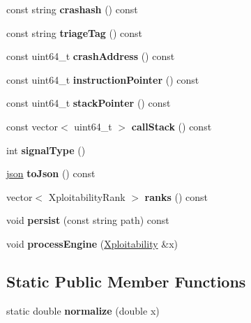 \begin{DoxyCompactItemize}
const string {\bfseries crashash} () const
\item 
\mbox{\label{classsl2_1_1_triage_ad5782327c97ac20a062688c6fb43eadc}} 
const string {\bfseries triage\+Tag} () const
\item 
\mbox{\label{classsl2_1_1_triage_a7160ecfc3f0b06cf74f68e9e6d1f74f7}} 
const uint64\+\_\+t {\bfseries crash\+Address} () const
\item 
\mbox{\label{classsl2_1_1_triage_aa206d88c999337680a8fb26abd024e5d}} 
const uint64\+\_\+t {\bfseries instruction\+Pointer} () const
\item 
\mbox{\label{classsl2_1_1_triage_acd973b42f743335196e8df108580ae54}} 
const uint64\+\_\+t {\bfseries stack\+Pointer} () const
\item 
\mbox{\label{classsl2_1_1_triage_a762ce49ae353fcdc96731eddbcd08cb5}} 
const vector$<$ uint64\+\_\+t $>$ {\bfseries call\+Stack} () const
\item 
\mbox{\label{classsl2_1_1_triage_a41dd1c06e89d051cbdb70ea6f7599e84}} 
int {\bfseries signal\+Type} ()
\item 
\mbox{\label{classsl2_1_1_triage_a40c223374522702fb6ce3a4951477c39}} 
\mbox{\hyperlink{classnlohmann_1_1basic__json}{json}} {\bfseries to\+Json} () const
\item 
\mbox{\label{classsl2_1_1_triage_a29c6eb6d45d145313f0aa703e5a080b4}} 
vector$<$ Xploitability\+Rank $>$ {\bfseries ranks} () const
\item 
\mbox{\label{classsl2_1_1_triage_aa00d8ed418660e34e5b158c561d39ca3}} 
void {\bfseries persist} (const string path) const
\item 
\mbox{\label{classsl2_1_1_triage_a1148ea31250d9033ac69cca85b5ee0be}} 
void {\bfseries process\+Engine} (\mbox{\hyperlink{classsl2_1_1_xploitability}{Xploitability}} \&x)
\end{DoxyCompactItemize}
\subsection*{Static Public Member Functions}
\begin{DoxyCompactItemize}
\item 
\mbox{\label{classsl2_1_1_triage_a2b70df328f807842d2c2804d10a05f7f}} 
static double {\bfseries normalize} (double x)
\end{DoxyCompactItemize}
